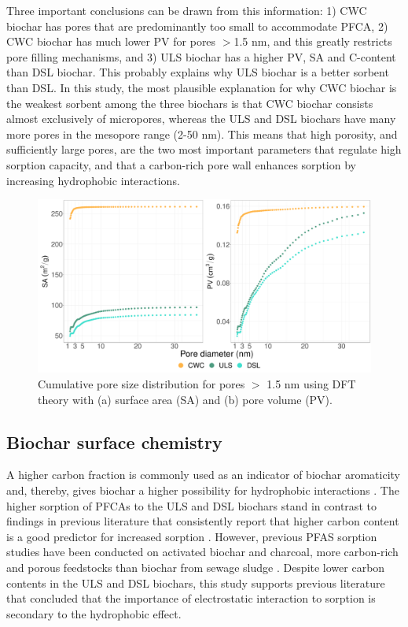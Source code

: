 Three important conclusions can be drawn from this information: 1) CWC biochar has pores that are predominantly too small to accommodate PFCA, 2) CWC biochar has much lower PV for pores $>$1.5 nm, and this greatly restricts pore filling mechanisms, and 3) ULS biochar has a higher PV, SA and C-content than DSL biochar. This probably explains why ULS biochar is a better sorbent than DSL. In this study, the most plausible explanation for why CWC biochar is the weakest sorbent among the three biochars is that CWC biochar consists almost exclusively of micropores, whereas the ULS and DSL biochars have many more pores in the mesopore range (2-50 nm). This means that high porosity, and sufficiently large pores, are the two most important parameters that regulate high sorption capacity, and that a carbon-rich pore wall enhances sorption by increasing hydrophobic interactions. 

\begin{figure}[htb]
    \centering
    \includegraphics[width=\textwidth]{R/figs/PZD_SA_PV_plot_large.pdf}
    \caption{Cumulative pore size distribution for pores $>$ 1.5 nm using DFT theory with (a) surface area (SA) and (b) pore volume (PV).}
    \label{fig:PZD_large}
\end{figure}

\subsection{Biochar surface chemistry}
A higher carbon fraction is commonly used as an indicator of biochar aromaticity and, thereby, gives biochar a higher possibility for hydrophobic interactions \citep{Cornelissen2005}. The higher sorption of PFCAs to the ULS and DSL biochars stand in contrast to findings in previous literature that consistently report that higher carbon content is a good predictor for increased sorption \citep{fabregat2022examining}. However, previous PFAS sorption studies have been conducted on activated biochar and charcoal, more carbon-rich and porous feedstocks than biochar from sewage sludge \citep{Sormo2021, zhang2021sorption}. Despite lower carbon contents in the ULS and DSL biochars, this study supports previous literature that concluded that the importance of electrostatic interaction to sorption is secondary to the hydrophobic effect. 

